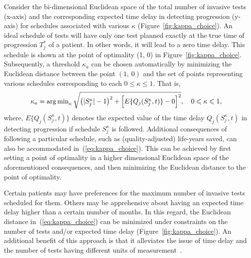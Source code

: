 Consider the bi-dimensional Euclidean space of the total number of invasive tests (x-axis) and the corresponding expected time delay in detecting progression (y-axis) for schedules associated with various $\kappa$ (Figure~\ref{fig:kappa_choice}). An ideal schedule of tests will have only one test planned exactly at the true time of progression $T^*_j$ of a patient. In other words, it will lead to a zero time delay. This schedule is shown at the point of optimality (1, 0) in Figure~\ref{fig:kappa_choice}. Subsequently, a threshold $\kappa_a$ can be chosen automatically by minimizing the Euclidean distance between the point $(1,~0)$ and the set of points representing various schedules corresponding to each $0 \leq \kappa \leq 1$. That is,
\begin{equation}
\label{eq:kappa_choice}
\kappa_a = \argmin_{\kappa} \sqrt{\big(\vert S_j^\kappa \vert - 1\big)^2 + \Big[E\{Q_j(S_j^{\kappa}, t)\} - 0\Big]^2} , \quad 0 \leq \kappa \leq 1,
\end{equation}
where, $E\{Q_j(S_j^{\kappa}, t)\}$ denotes the expected value of the time delay $Q_j(S_j^{\kappa}, t)$ in detecting progression if schedule $S_j^{\kappa}$ is followed. Additional consequences of following a particular schedule, such as (quality-adjusted) life-years saved, can also be accommodated in~(\ref{eq:kappa_choice}). This can be achieved by first setting a point of optimality in a higher dimensional Euclidean space of the aforementioned consequences, and then minimizing the Euclidean distance to the point of optimality.

Certain patients may have preferences for the maximum number of invasive tests scheduled for them. Others may be apprehensive about having an expected time delay higher than a certain number of months. In this regard, the Euclidean distance in~(\ref{eq:kappa_choice}) can be minimized under constraints on the number of tests and/or expected time delay (Figure~\ref{fig:kappa_choice}). An additional benefit of this approach is that it alleviates the issue of time delay and the number of tests having different units of measurement~\citep{cook1994equivalence}.

